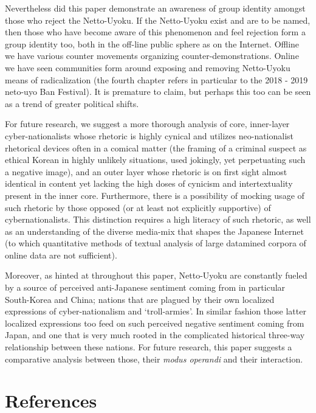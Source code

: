 \documentclass[10pt,british,A4paper,oneside]{memoir}
\begin{document}
Nevertheless did this paper demonstrate an awareness of group identity
amongst those who reject the Netto-Uyoku. If the Netto-Uyoku exist and
are to be named, then those who have become aware of this phenomenon and
feel rejection form a group identity too, both in the off-line public
sphere as on the Internet. Offline we have various counter movements
organizing counter-demonstrations. Online we have seen communities form
around exposing and removing Netto-Uyoku means of radicalization (the
fourth chapter refers in particular to the 2018 - 2019 neto-uyo Ban
Festival). It is premature to claim, but perhaps this too can be seen as
a trend of greater political shifts.

For future research, we suggest a more thorough analysis of core, inner-layer
cyber-nationalists whose rhetoric is highly cynical and utilizes
neo-nationalist rhetorical devices often in a comical matter (the
framing of a criminal suspect as ethical Korean in highly unlikely
situations, used jokingly, yet perpetuating such a negative image), and
an outer layer whose rhetoric is on first sight almost identical in
content yet lacking the high doses of cynicism and intertextuality
present in the inner core. Furthermore, there is a possibility of
mocking usage of such rhetoric by those opposed (or at least not
explicitly supportive) of cybernationalists. This distinction requires a
high literacy of such rhetoric, as well as an understanding of the
diverse media-mix that shapes the Japanese Internet (to which quantitative methods of textual analysis of large datamined corpora of
online data are not sufficient).

Moreover, as hinted at throughout this paper, Netto-Uyoku are constantly
fueled by a source of perceived anti-Japanese sentiment coming from in
particular South-Korea and China; nations that are plagued by their own
localized expressions of cyber-nationalism and `troll-armies'. In
similar fashion those latter localized expressions too feed on such
perceived negative sentiment coming from Japan, and one that is very
much rooted in the complicated historical three-way relationship between
these nations. For future research, this paper suggests a comparative
analysis between those, their \emph{modus operandi} and their
interaction.

\newpage

\begingroup
{}

\chapter*{References}
\end{document}
